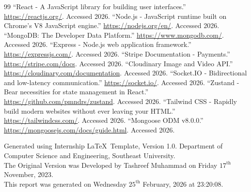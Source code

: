 \documentclass[12pt,a4paper]{report}
\begin{document}
\newpage
\begin{thebibliography}{99}
 ``React - A JavaScript library for building user interfaces.'' \url{https://reactjs.org/}. Accessed 2026.
 ``Node.js - JavaScript runtime built on Chrome's V8 JavaScript engine.'' \url{https://nodejs.org/en/}. Accessed 2026.
 ``MongoDB: The Developer Data Platform.'' \url{https://www.mongodb.com/}. Accessed 2026.
 ``Express - Node.js web application framework.'' \url{https://expressjs.com/}. Accessed 2026.
 ``Stripe Documentation - Payments.'' \url{https://stripe.com/docs}. Accessed 2026.
 ``Cloudinary Image and Video API.'' \url{https://cloudinary.com/documentation}. Accessed 2026.
 ``Socket.IO - Bidirectional and low-latency communication.'' \url{https://socket.io/}. Accessed 2026.
 ``Zustand - Bear necessities for state management in React.'' \url{https://github.com/pmndrs/zustand}. Accessed 2026.
 ``Tailwind CSS - Rapidly build modern websites without ever leaving your HTML.'' \url{https://tailwindcss.com/}. Accessed 2026.
 ``Mongoose ODM v8.0.0.'' \url{https://mongoosejs.com/docs/guide.html}. Accessed 2026.
\end{thebibliography}

\newpage
\thispagestyle{lastpage}
\mbox{}
\vfill
\begin{center}
    \small
    Generated using Internship \LaTeX\ Template, Version 1.0. Department of Computer Science and Engineering, Southeast University.\\
    The Original Version was Developed by Tashreef Muhammad on Friday $17^{\text{th}}$ November, 2023.\\
    This report was generated on Wednesday $25^{\text{th}}$ February, 2026 at 23:20:08.
\end{center}
\end{document}
